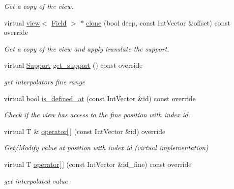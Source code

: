 \begin{DoxyCompactItemize}
\begin{DoxyCompactList}\small\item\em Get a copy of the view. \end{DoxyCompactList}\item 
virtual \hyperlink{classUintah_1_1PhaseField_1_1detail_1_1view}{view}$<$ \hyperlink{structUintah_1_1PhaseField_1_1ScalarField}{Field} $>$ $\ast$ \hyperlink{classUintah_1_1PhaseField_1_1detail_1_1amr__interpolator_3_01ScalarField_3_01T_01_4_00_01Problem71844444bc14a03c0566689b6b502040_a52720f26bf906c6bd380490b4579ffa0}{clone} (bool deep, const Int\+Vector \&offset) const override
\begin{DoxyCompactList}\small\item\em Get a copy of the view and apply translate the support. \end{DoxyCompactList}\item 
virtual \hyperlink{classUintah_1_1PhaseField_1_1Support}{Support} \hyperlink{classUintah_1_1PhaseField_1_1detail_1_1amr__interpolator_3_01ScalarField_3_01T_01_4_00_01Problem71844444bc14a03c0566689b6b502040_aab5b3fae360fb157ff3a6cba940f0db2}{get\+\_\+support} () const override
\begin{DoxyCompactList}\small\item\em get interpolator\textquotesingle{}s fine range \end{DoxyCompactList}\item 
virtual bool \hyperlink{classUintah_1_1PhaseField_1_1detail_1_1amr__interpolator_3_01ScalarField_3_01T_01_4_00_01Problem71844444bc14a03c0566689b6b502040_a0dd27e67f64c434b482cf31dcd395068}{is\+\_\+defined\+\_\+at} (const Int\+Vector \&id) const override
\begin{DoxyCompactList}\small\item\em Check if the view has access to the fine position with index id. \end{DoxyCompactList}\item 
virtual T \& \hyperlink{classUintah_1_1PhaseField_1_1detail_1_1amr__interpolator_3_01ScalarField_3_01T_01_4_00_01Problem71844444bc14a03c0566689b6b502040_a61e5afaf74c959be8ac8b1d5a57f01d5}{operator\mbox{[}$\,$\mbox{]}} (const Int\+Vector \&id) override
\begin{DoxyCompactList}\small\item\em Get/\+Modify value at position with index id (virtual implementation) \end{DoxyCompactList}\item 
virtual T \hyperlink{classUintah_1_1PhaseField_1_1detail_1_1amr__interpolator_3_01ScalarField_3_01T_01_4_00_01Problem71844444bc14a03c0566689b6b502040_a94e3434279f44322dd2fe65f16a15613}{operator\mbox{[}$\,$\mbox{]}} (const Int\+Vector \&id\+\_\+fine) const override
\begin{DoxyCompactList}\small\item\em get interpolated value \end{DoxyCompactList}\end{DoxyCompactItemize}
